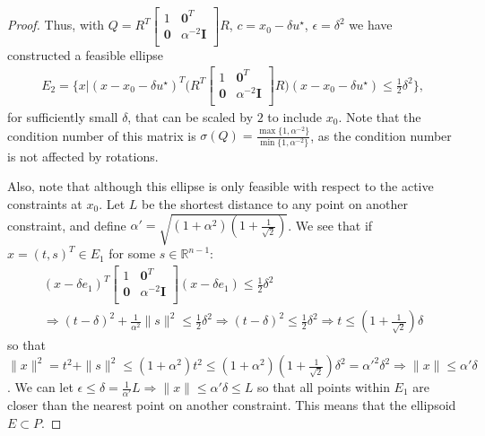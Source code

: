 \begin{proof}
Thus, with $Q = R^T\begin{bmatrix}
1 & \boldsymbol0^T \\
\boldsymbol 0 & \alpha^{-2} \boldsymbol I \\
\end{bmatrix}R$, $c = x_0 - \delta u^{\star}$, $\epsilon = \delta^2$ we have constructed a feasible ellipse
\begin{align*}
E_2 = \bigg \{x \bigg | (x - x_0 - \delta u^{\star})^T\bigg(R^T\begin{bmatrix}
1 & \boldsymbol0^T \\
\boldsymbol 0 & \alpha^{-2} \boldsymbol I \\
\end{bmatrix}R\bigg)(x - x_0 - \delta u^{\star}) \le \frac 1 2 \delta^2 \bigg\},
\end{align*}
for sufficiently small $\delta$, that can be scaled by $2$ to include $x_0$.
Note that the condition number of this matrix is $\sigma(Q) = \frac{\max\{1, \alpha^{-2}\}}{\min\{1, \alpha^{-2}\}}$,
as the condition number is not affected by rotations.

Also, note that although this ellipse is only feasible with respect to the active constraints at $x_0$.
Let $L$ be the shortest distance to any point on another constraint, and define $\alpha' = \sqrt{\left(1 + \alpha^2 \right) \left(1 + \frac 1 {\sqrt{2}}\right)}$.
We see that if $x = (t, s)^T \in E_1$ for some $s \in \mathbb R^{n-1}$:
\begin{align*}
(x - \delta e_1)^T\begin{bmatrix}
1 & \boldsymbol0^T \\
\boldsymbol 0 & \alpha^{-2} \boldsymbol I \\
\end{bmatrix}(x - \delta e_1) \le \frac 1 2 \delta^2 \\
\Longrightarrow (t - \delta)^2 + \frac {1} {\alpha^2} \|s\|^2 \le \frac 1 2 \delta^2
\Longrightarrow (t - \delta)^2 \le \frac 1 2 \delta^2
\Longrightarrow t \le \left(1 + \frac 1 {\sqrt{2}}\right) \delta
\end{align*}
so that $\|x\|^2 = t^2 + \|s\|^2 \le \left(1 + \alpha^2 \right) t^2 \le \left(1 + \alpha^2 \right) \left(1 + \frac 1 {\sqrt{2}}\right) \delta^2 = {\alpha'}^2 \delta^2 \Longrightarrow \|x\| \le \alpha' \delta$.
We can let $\epsilon \le \delta = \frac 1 {\alpha'} L \Longrightarrow \|x\| \le \alpha' \delta \le L$ so that all points within $E_1$ are closer than the nearest point on another constraint.
This means that the ellipsoid $E \subset P$.
\end{proof}

